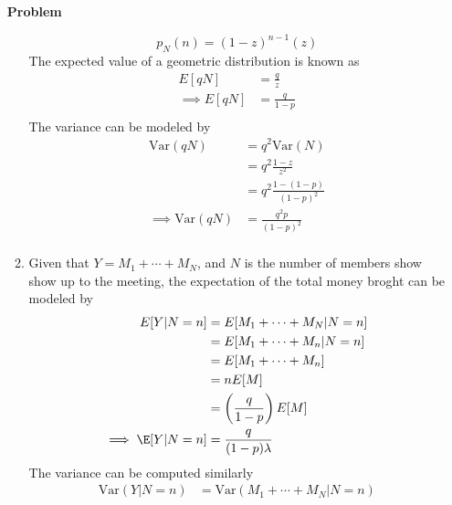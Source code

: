 \documentclass[12pt]{article}
\newenvironment{Ex}{\textbf{Problem}\vspace{.75em}\\}{}
\begin{document}
\begin{enumerate}
\begin{Ex}
\begin{solution}
\begin{enumerate}
\begin{equation}
          \label{eq:4a-pmf-z}
          p_N(n) = (1-z)^{n-1}(z)
        \end{equation}
        The expected value of a geometric distribution is known as
        \begin{equation}
          \label{eq:4a-expectation-z}
          \begin{aligned}
            E[qN] &= \frac{q}{z} \\
            \implies E[qN] &= \frac{q}{1-p} \\
          \end{aligned}
        \end{equation}
        The variance can be modeled by
        \begin{equation}
          \label{eq:4-variance}
          \begin{aligned}
            \text{Var}(qN) &= q^2\text{Var}(N) \\
            &= q^2\frac{1-z}{z^2} \\
            &= q^2\frac{1-(1-p)}{(1-p)^2} \\
            \implies \text{Var}(qN) &= \frac{q^2p}{(1-p)^2} \\
          \end{aligned}
        \end{equation}
      \item Given that $Y=M_1 + \cdots + M_N$, and $N$ is the number
        of members show show up to the meeting, the expectation of the
        total money broght can be modeled by
        \begin{equation}
          \label{eq:4b-expectation}
          \begin{aligned}
            E[Y|N=n] &= E[M_1 + \cdots + M_N | N=n] \\
            &= E[M_1 + \cdots + M_n | N=n] \\
            &= E[M_1 + \cdots + M_n] \\
            &= n E[M] \\
            &= \left(\frac{q}{1-p}\right)E[M] \\
            \implies \E[Y|N=n] &= \frac{q}{(1-p)\lambda} \\
          \end{aligned}
        \end{equation}
        The variance can be computed similarly
        \begin{equation}
          \label{eq:4b-variance}
          \begin{aligned}
            \text{Var}(Y|N=n) &= \text{Var}(M_1 + \cdots + M_N|N=n) \\

\end{aligned}
\end{equation}
\end{enumerate}
\end{solution}
\end{Ex}
\end{enumerate}
\end{document}
